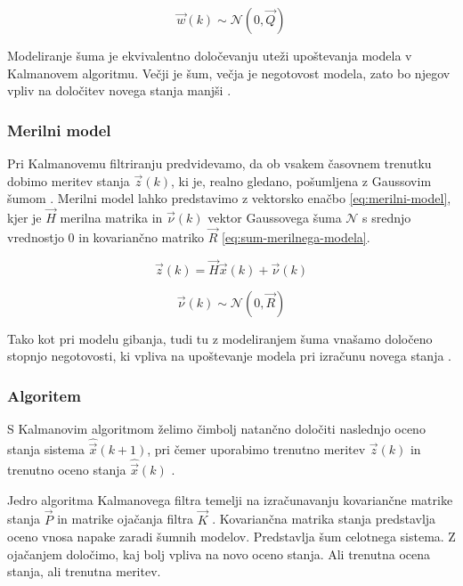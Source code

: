 \begin{equation}
 \vec{w}(k) \sim \mathcal{N}\left(0,\vec{Q}\right)
 \label{eq:sum-modela-gibanja}
\end{equation}

Modeliranje šuma je ekvivalentno določevanju uteži upoštevanja modela v Kalmanovem algoritmu. Večji je šum, večja je negotovost modela, zato bo njegov vpliv na določitev novega stanja manjši \cite{trucco1998introductory}.


\subsubsection{Merilni model}
Pri Kalmanovemu filtriranju predvidevamo, da ob vsakem časovnem trenutku dobimo meritev stanja $\vec{z}(k)$, ki je, realno gledano, pošumljena z Gaussovim šumom \cite{trucco1998introductory}. Merilni model lahko predstavimo z vektorsko enačbo \eqref{eq:merilni-model}, kjer je $\vec{H}$ merilna matrika in $\vec{\nu}(k)$ vektor Gaussovega šuma $\mathcal{N}$ s srednjo vrednostjo $0$ in kovariančno matriko $\vec{R}$ \eqref{eq:sum-merilnega-modela}.


\begin{equation}
 \vec{z}(k) = \vec{H} \vec{x}(k) + \vec{\nu}(k)
 \label{eq:merilni-model}
\end{equation}

\begin{equation}
\vec{\nu}(k) \sim \mathcal{N} \left( 0, \vec{R} \right)
\label{eq:sum-merilnega-modela}
\end{equation}


Tako kot pri modelu gibanja, tudi tu z modeliranjem šuma vnašamo določeno stopnjo negotovosti, ki vpliva na upoštevanje modela pri izračunu novega stanja \cite{trucco1998introductory}.


\subsubsection{Algoritem}
S Kalmanovim algoritmom želimo čimbolj natančno določiti naslednjo oceno stanja sistema $\hat{\vec{x}}(k+1)$, pri čemer uporabimo trenutno meritev $\vec{z}(k)$ in trenutno oceno stanja $\hat{\vec{x}}(k)$ \cite{trucco1998introductory}. 

Jedro algoritma Kalmanovega filtra temelji na izračunavanju kovariančne matrike stanja $\vec{P}$ in matrike ojačanja filtra $\vec{K}$ \cite{trucco1998introductory}. Kovariančna matrika stanja predstavlja oceno vnosa napake zaradi šumnih modelov. Predstavlja šum celotnega sistema. Z ojačanjem določimo, kaj bolj vpliva na novo oceno stanja. Ali trenutna ocena stanja, ali trenutna meritev.

